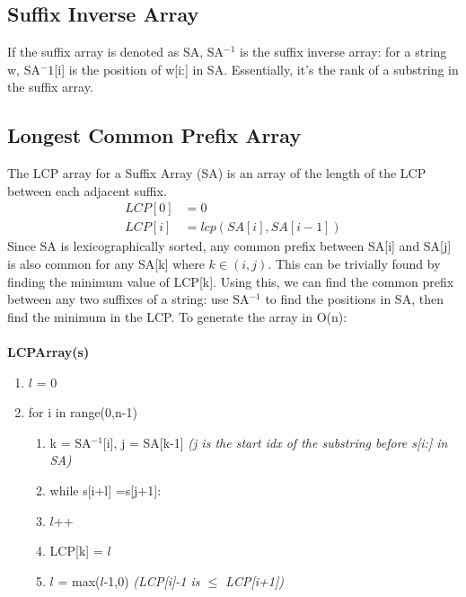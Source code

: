 \newpage 
\subsection{Suffix Inverse Array}
If the suffix array is denoted as SA, SA$^{-1}$ is the suffix inverse array: for a string w, SA$^-1$[i] is the position of w[i:] in SA. Essentially, it's the rank of a substring in the suffix array.

\subsection{Longest Common Prefix Array}
The LCP array for a Suffix Array (SA) is an array of the length of the LCP between each adjacent suffix.
\begin{align}
    LCP[0]&=0 \nonumber \\
    LCP[i]&=lcp(SA[i],SA[i-1]) \nonumber 
\end{align}
Since SA is lexicographically sorted, any common prefix between SA[i] and SA[j] is also common for any SA[k] where $k \in (i,j)$. This can be trivially found by finding the minimum value of LCP[k]. Using this, we can find the common prefix between any two suffixes of a string: use SA$^{-1}$ to find the positions in SA, then find the minimum in the LCP. To generate the array in O(n): \\ \\
\textbf{LCPArray(s)}
\begin{enumerate}[label=\Alph*]
    \item $l$ = 0
    \item for i in range(0,n-1)
    \begin{enumerate}[label=\arabic*]
        \item k = SA$^{-1}$[i], j = SA[k-1] \emph{(j is the start idx of the substring before s[i:] in SA)}
        \item while s[i+l] =s[j+1]:
        \item[] \quad $l$++
        \item LCP[k] = $l$
        \item $l$ = max($l$-1,0) \emph{(LCP[i]-1 is $\leq$ LCP[i+1])}
    \end{enumerate}
\end{enumerate}



